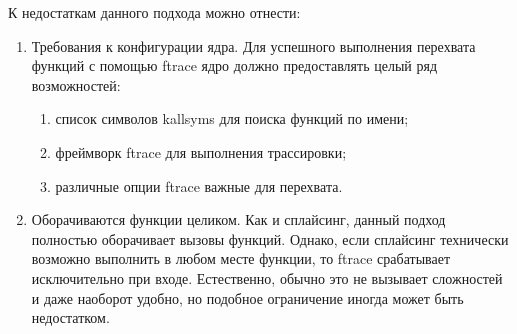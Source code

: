 		К недостаткам данного подхода можно отнести:
		\begin{enumerate}
			\item Требования к конфигурации ядра. 
			Для успешного выполнения перехвата функций с помощью ftrace ядро должно предоставлять целый ряд возможностей:
			\begin{enumerate}
				\item список символов kallsyms для поиска функций по имени;
				\item фреймворк ftrace для выполнения трассировки;
				\item различные опции ftrace важные для перехвата.
			\end{enumerate}
			\item Оборачиваются функции целиком. 
				Как и сплайсинг, данный подход полностью оборачивает вызовы функций.
				Однако, если сплайсинг технически возможно выполнить в любом месте функции,
				то ftrace срабатывает исключительно при входе. 
				Естественно, обычно это не вызывает сложностей и даже наоборот удобно,
				но подобное ограничение иногда может быть недостатком.
		\end{enumerate}

